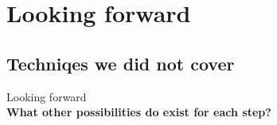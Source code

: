 \documentclass{beamer}
\begin{document}



%
%		
%		
%		
%		
%	
%
%



\section{Looking forward}
\subsection{Techniqes we did not cover}
\begin{frame}[plain]{}
Looking forward\\
\textbf{What other possibilities do exist for each step?}
\end{frame}
\end{document}
